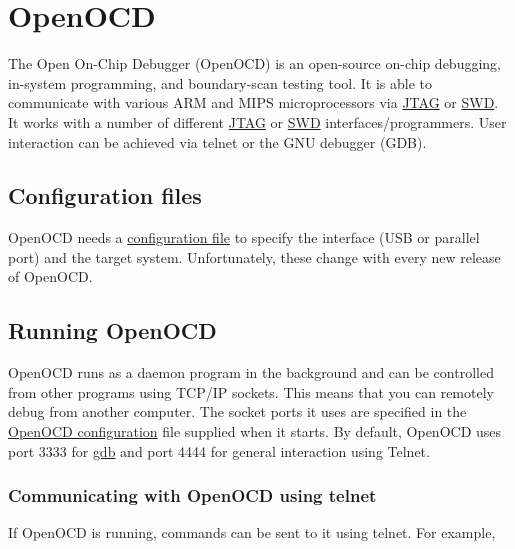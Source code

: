 \chapter{OpenOCD}

The Open On-Chip Debugger (OpenOCD) is an open-source on-chip debugging,
in-system programming, and boundary-scan testing tool. It is able to
communicate with various ARM and MIPS microprocessors via \url{JTAG} or
\url{SWD}. It works with a number of different \url{JTAG} or \url{SWD}
interfaces/programmers. User interaction can be achieved via telnet or
the GNU debugger (GDB).

\section{Configuration files}
\label{configuration-files}

OpenOCD needs a \href{OpenOCD_configuration}{configuration file} to
specify the interface (USB or parallel port) and the target system.
Unfortunately, these change with every new release of OpenOCD.

\section{Running OpenOCD}
\label{running-openocd}

OpenOCD runs as a daemon program in the background and can be controlled
from other programs using TCP/IP sockets. This means that you can
remotely debug from another computer. The socket ports it uses are
specified in the \href{OpenOCD_configuration}{OpenOCD configuration}
file supplied when it starts. By default, OpenOCD uses port 3333 for
\url{gdb} and port 4444 for general interaction using Telnet.

\subsection{Communicating with OpenOCD using telnet}
\label{communicating-with-openocd-using-telnet}

If OpenOCD is running, commands can be sent to it using telnet. For
example,

\begin{Shaded}
\begin{Highlighting}[]
\NormalTok{$ }
\OperatorTok{>} 
\end{Highlighting}
\end{Shaded}

